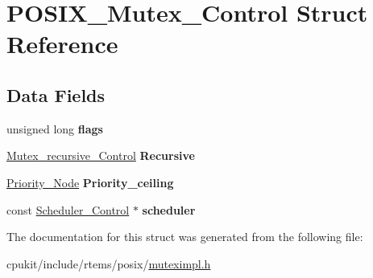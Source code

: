 \hypertarget{structPOSIX__Mutex__Control}{}\section{P\+O\+S\+I\+X\+\_\+\+Mutex\+\_\+\+Control Struct Reference}
\label{structPOSIX__Mutex__Control}
\subsection*{Data Fields}
\begin{DoxyCompactItemize}
\item 
\mbox{\label{structPOSIX__Mutex__Control_a0755fd338b7a4b290c1f203753fa9690}} 
unsigned long {\bfseries flags}
\item 
\mbox{\label{structPOSIX__Mutex__Control_a79da60dcb578a65eb50436bef9ee6470}} 
\mbox{\hyperlink{structMutex__recursive__Control}{Mutex\+\_\+recursive\+\_\+\+Control}} {\bfseries Recursive}
\item 
\mbox{\label{structPOSIX__Mutex__Control_a9319cba8e1e0e0a8b7b9cb7278d7a7c8}} 
\mbox{\hyperlink{structPriority__Node}{Priority\+\_\+\+Node}} {\bfseries Priority\+\_\+ceiling}
\item 
\mbox{\label{structPOSIX__Mutex__Control_a4f55c475c903487aa3da13108849a846}} 
const \mbox{\hyperlink{struct__Scheduler__Control}{Scheduler\+\_\+\+Control}} $\ast$ {\bfseries scheduler}
\end{DoxyCompactItemize}


The documentation for this struct was generated from the following file\+:\begin{DoxyCompactItemize}
\item 
cpukit/include/rtems/posix/\mbox{\hyperlink{posix_2muteximpl_8h}{muteximpl.\+h}}\end{DoxyCompactItemize}
